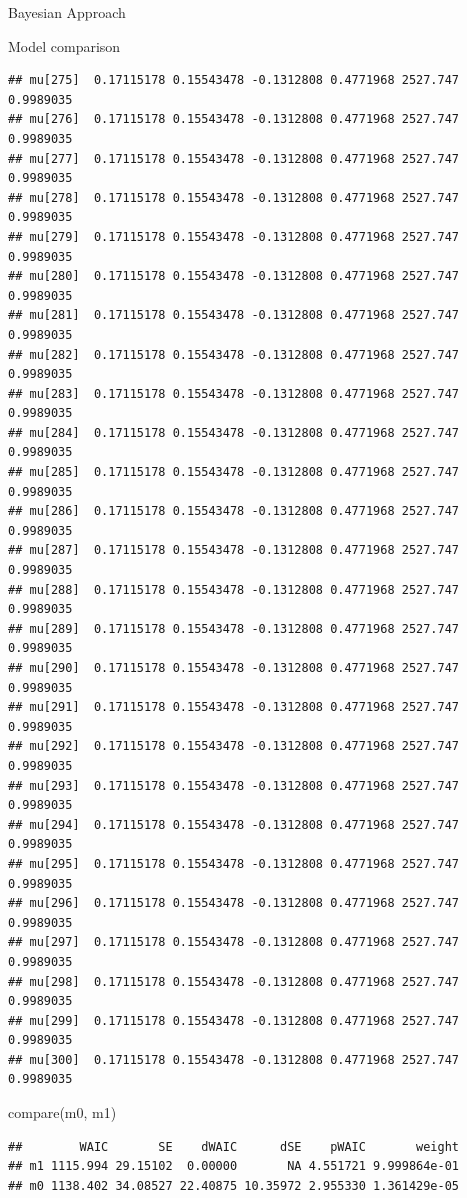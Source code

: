 \documentclass[
  ignorenonframetext,
]{beamer}
\newenvironment{Shaded}{\begin{snugshade}}{\end{snugshade}}
\newcommand{\FunctionTok}[1]{\textcolor[rgb]{0.00,0.00,0.00}{#1}}
\newcommand{\NormalTok}[1]{#1}
\begin{document}
\begin{frame}[fragile]{Bayesian Approach}
\begin{block}{Model comparison}
\begin{verbatim}
## mu[275]  0.17115178 0.15543478 -0.1312808 0.4771968 2527.747 0.9989035
## mu[276]  0.17115178 0.15543478 -0.1312808 0.4771968 2527.747 0.9989035
## mu[277]  0.17115178 0.15543478 -0.1312808 0.4771968 2527.747 0.9989035
## mu[278]  0.17115178 0.15543478 -0.1312808 0.4771968 2527.747 0.9989035
## mu[279]  0.17115178 0.15543478 -0.1312808 0.4771968 2527.747 0.9989035
## mu[280]  0.17115178 0.15543478 -0.1312808 0.4771968 2527.747 0.9989035
## mu[281]  0.17115178 0.15543478 -0.1312808 0.4771968 2527.747 0.9989035
## mu[282]  0.17115178 0.15543478 -0.1312808 0.4771968 2527.747 0.9989035
## mu[283]  0.17115178 0.15543478 -0.1312808 0.4771968 2527.747 0.9989035
## mu[284]  0.17115178 0.15543478 -0.1312808 0.4771968 2527.747 0.9989035
## mu[285]  0.17115178 0.15543478 -0.1312808 0.4771968 2527.747 0.9989035
## mu[286]  0.17115178 0.15543478 -0.1312808 0.4771968 2527.747 0.9989035
## mu[287]  0.17115178 0.15543478 -0.1312808 0.4771968 2527.747 0.9989035
## mu[288]  0.17115178 0.15543478 -0.1312808 0.4771968 2527.747 0.9989035
## mu[289]  0.17115178 0.15543478 -0.1312808 0.4771968 2527.747 0.9989035
## mu[290]  0.17115178 0.15543478 -0.1312808 0.4771968 2527.747 0.9989035
## mu[291]  0.17115178 0.15543478 -0.1312808 0.4771968 2527.747 0.9989035
## mu[292]  0.17115178 0.15543478 -0.1312808 0.4771968 2527.747 0.9989035
## mu[293]  0.17115178 0.15543478 -0.1312808 0.4771968 2527.747 0.9989035
## mu[294]  0.17115178 0.15543478 -0.1312808 0.4771968 2527.747 0.9989035
## mu[295]  0.17115178 0.15543478 -0.1312808 0.4771968 2527.747 0.9989035
## mu[296]  0.17115178 0.15543478 -0.1312808 0.4771968 2527.747 0.9989035
## mu[297]  0.17115178 0.15543478 -0.1312808 0.4771968 2527.747 0.9989035
## mu[298]  0.17115178 0.15543478 -0.1312808 0.4771968 2527.747 0.9989035
## mu[299]  0.17115178 0.15543478 -0.1312808 0.4771968 2527.747 0.9989035
## mu[300]  0.17115178 0.15543478 -0.1312808 0.4771968 2527.747 0.9989035
\end{verbatim}

\begin{Shaded}
\begin{Highlighting}[]
\FunctionTok{compare}\NormalTok{(m0, m1)}
\end{Highlighting}
\end{Shaded}

\begin{verbatim}
##        WAIC       SE    dWAIC      dSE    pWAIC       weight
## m1 1115.994 29.15102  0.00000       NA 4.551721 9.999864e-01
## m0 1138.402 34.08527 22.40875 10.35972 2.955330 1.361429e-05
\end{verbatim}
\end{block}


\end{frame}
\end{document}

